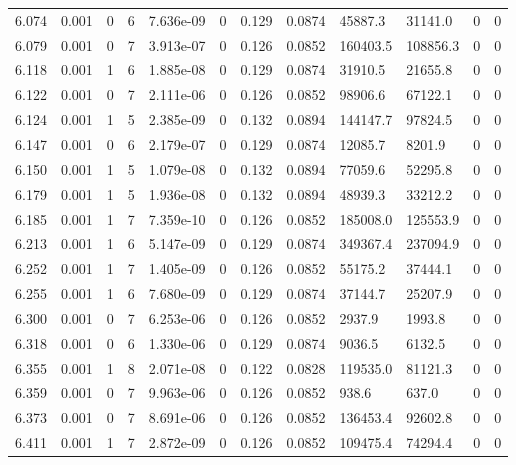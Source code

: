 \documentclass[preview]{standalone}
\begin{document}
{{{{{{{\begin{tabular}{L{1.2cm}C{1.2cm} C{0.3cm}C{0.5cm} C{1.4cm}C{1.4cm} C{1.4cm}C{1.4cm} C{1.6cm}C{1.6cm} C{1.6cm}C{1.6cm}}
  6.074  &  0.001  & 0     &  6 &  7.636e-09  & 0  &  0.129&   0.0874& 45887.3 & 31141.0   &  0 & 0  \\ 
  6.079  &  0.001  & 0     &  7 &  3.913e-07  & 0  &  0.126&   0.0852& 160403.5 & 108856.3   &  0 & 0  \\ 
  6.118  &  0.001  & 1     &  6 &  1.885e-08  & 0  &  0.129&   0.0874& 31910.5 & 21655.8   &  0 & 0  \\ 
  6.122  &  0.001  & 0     &  7 &  2.111e-06  & 0  &  0.126&   0.0852& 98906.6 & 67122.1   &  0 & 0  \\ 
  6.124  &  0.001  & 1     &  5 &  2.385e-09  & 0  &  0.132&   0.0894& 144147.7 & 97824.5   &  0 & 0  \\ 
  6.147  &  0.001  & 0     &  6 &  2.179e-07  & 0  &  0.129&   0.0874& 12085.7 & 8201.9   &  0 & 0  \\ 
  6.150  &  0.001  & 1     &  5 &  1.079e-08  & 0  &  0.132&   0.0894& 77059.6 & 52295.8   &  0 & 0  \\ 
  6.179  &  0.001  & 1     &  5 &  1.936e-08  & 0  &  0.132&   0.0894& 48939.3 & 33212.2   &  0 & 0  \\ 
  6.185  &  0.001  & 1     &  7 &  7.359e-10  & 0  &  0.126&   0.0852& 185008.0 & 125553.9   &  0 & 0  \\ 
  6.213  &  0.001  & 1     &  6 &  5.147e-09  & 0  &  0.129&   0.0874& 349367.4 & 237094.9   &  0 & 0  \\ 
  6.252  &  0.001  & 1     &  7 &  1.405e-09  & 0  &  0.126&   0.0852& 55175.2 & 37444.1   &  0 & 0  \\ 
  6.255  &  0.001  & 1     &  6 &  7.680e-09  & 0  &  0.129&   0.0874& 37144.7 & 25207.9   &  0 & 0  \\ 
  6.300  &  0.001  & 0     &  7 &  6.253e-06  & 0  &  0.126&   0.0852& 2937.9 & 1993.8   &  0 & 0  \\ 
  6.318  &  0.001  & 0     &  6 &  1.330e-06  & 0  &  0.129&   0.0874& 9036.5 & 6132.5   &  0 & 0  \\ 
  6.355  &  0.001  & 1     &  8 &  2.071e-08  & 0  &  0.122&   0.0828& 119535.0 & 81121.3   &  0 & 0  \\ 
  6.359  &  0.001  & 0     &  7 &  9.963e-06  & 0  &  0.126&   0.0852& 938.6 & 637.0   &  0 & 0  \\ 
  6.373  &  0.001  & 0     &  7 &  8.691e-06  & 0  &  0.126&   0.0852& 136453.4 & 92602.8   &  0 & 0  \\ 
  6.411  &  0.001  & 1     &  7 &  2.872e-09  & 0  &  0.126&   0.0852& 109475.4 & 74294.4   &  0 & 0  \\ 

\end{tabular}}}}}}}}
\end{document}
